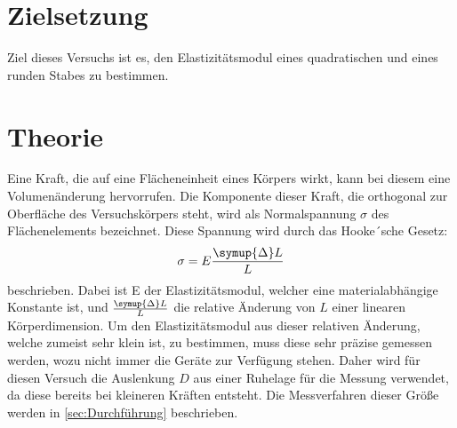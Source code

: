 \section{Zielsetzung}
\label{sec:Zielsetzung}
Ziel dieses Versuchs ist es, den Elastizitätsmodul eines quadratischen und eines runden Stabes zu bestimmen.
\section{Theorie}
\label{sec:Theorie}
Eine Kraft, die auf eine Flächeneinheit eines Körpers wirkt, kann bei diesem eine Volumenänderung hervorrufen.
Die Komponente dieser Kraft, die orthogonal zur Oberfläche des Versuchskörpers steht, wird als Normalspannung $\sigma$ des Flächenelements bezeichnet.
Diese Spannung wird durch das Hooke´sche Gesetz:
\begin{equation}
    \sigma = E\frac{\symup{\Delta}L}{L}
\end{equation}
beschrieben. Dabei ist E der Elastizitätsmodul, welcher eine materialabhängige Konstante ist, und $\frac{\symup{\Delta}L}{L}$
die relative Änderung von $L$ einer linearen Körperdimension. Um den Elastizitätsmodul aus dieser relativen Änderung, welche zumeist sehr klein ist, zu bestimmen,
muss diese sehr präzise gemessen werden, wozu nicht immer die Geräte zur Verfügung stehen. Daher wird für diesen Versuch die Auslenkung $D$ aus einer Ruhelage
für die Messung verwendet, da diese bereits bei kleineren Kräften entsteht. Die Messverfahren dieser Größe werden in \autoref{sec:Durchführung} beschrieben.
